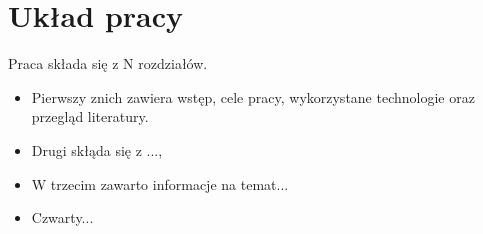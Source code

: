 	\newpage
\section{Układ pracy}
\label{sec:ukladPracy}

Praca składa się z N rozdziałów. 

\begin{itemize}
\item Pierwszy znich zawiera wstęp, cele pracy, wykorzystane technologie oraz przegląd literatury. 
\item Drugi skłąda się z ..., 
\item W trzecim zawarto informacje na temat...
\item Czwarty...
\end{itemize}